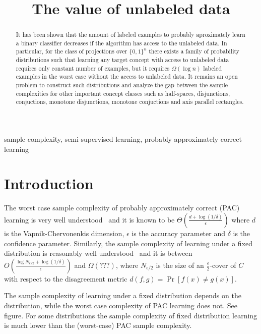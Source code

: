 \documentclass[12pt]{colt2019}
\title{The value of unlabeled data}
\begin{document}
\maketitle

\begin{abstract}
It has been shown that the amount of labeled examples to probably aproximately
learn a binary classifier decreases if the algorithm has access to the unlabeled
data. In particular, for the class of projections over $\{0,1\}^n$ there exists
a family of probability distributions such that learning any target concept with
access to unlabeled data requires only constant number of examples, but it requires
$\Omega(\log n)$ labeled examples in the worst case without the access to
unlabeled data. It remains an open problem to construct such distributions and
analyze the gap between the sample complexities for other important concept
classes such as half-spaces, disjunctions, conjuctions, monotone disjunctions,
monotone conjuctions and axis parallel rectangles.
\end{abstract}

\begin{keywords}
sample complexity, semi-supervised learning, probably approximately correct learning
\end{keywords}

\section{Introduction}

The worst case sample complexity of probably approximately correct (PAC) learning is
very well understood~\cite{Hanneke-2016} and it is known to be $\Theta(\frac{d +
\log(1/\delta)}{\epsilon})$ where $d$ is the Vapnik-Chervonenkis dimension,
$\epsilon$ is the accuracy parameter and $\delta$ is the confidence parameter.
Similarly, the sample complexity of learning under a fixed distribution is
reasonably well understood~\cite{Benedek-Itai-1991} and it is between $O(\frac{\log N_{\epsilon/2} +
\log(1/\delta)}{\epsilon})$ and $\Omega(???)$, where $N_{\epsilon/2}$ is the size of an $\frac{\epsilon}{2}$-cover
of $C$ with respect to the disagreement metric $d(f,g) = \Pr[f(x) \neq g(x)]$.

The sample complexity of learning under a fixed distribution depends on the
distribution, while the worst case complexity of PAC learning does not. See figure.
For some distributions the sample complexity of fixed distribution learning is
much lower than the (worst-case) PAC sample complexity.
\end{document}
